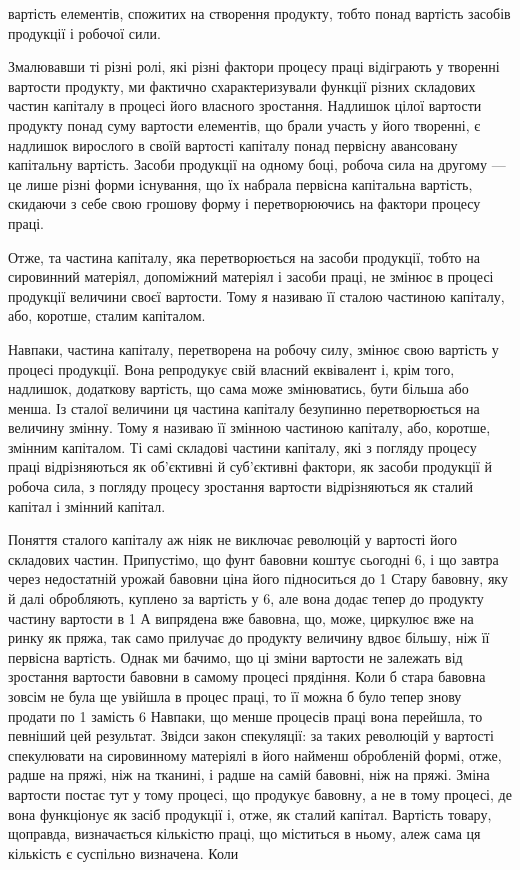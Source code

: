 \parcont{}  %
вартість елементів, спожитих на створення продукту, тобто понад вартість засобів продукції і робочої
сили.

Змалювавши ті різні ролі, які різні фактори процесу праці відіграють у творенні
вартости продукту, ми фактично схарактеризували функції різних складових частин
капіталу в процесі його власного зростання. Надлишок цілої вартости продукту
понад суму вартости елементів, що брали участь у його
творенні, є надлишок вирослого в своїй вартості капіталу понад первісну
авансовану капітальну вартість. Засоби продукції на одному боці, робоча сила
на другому — це лише різні форми існування, що їх набрала первісна капітальна
вартість, скидаючи з себе свою грошову форму і перетворюючись на
фактори процесу праці.

Отже, та частина капіталу, яка перетворюється на засоби продукції,
тобто на сировинний матеріял, допоміжний матеріял і засоби праці, не змінює в
процесі продукції величини своєї вартости. Тому я називаю її сталою частиною
капіталу, або, коротше, сталим капіталом.

Навпаки, частина капіталу, перетворена на робочу силу, змінює свою вартість у
процесі продукції. Вона репродукує свій власний еквівалент і, крім того,
надлишок, додаткову вартість, що сама може змінюватись, бути більша або менша.
Із сталої величини ця частина капіталу безупинно перетворюється
на величину змінну. Тому я називаю її змінною частиною капіталу, або, коротше,
змінним капіталом. Ті самі складові частини капіталу, які з погляду процесу
праці відрізняються як об’єктивні й суб’єктивні фактори, як засоби продукції й
робоча сила, з погляду процесу зростання вартости відрізняються як
сталий капітал і змінний капітал.

Поняття сталого капіталу аж ніяк не виключає революцій у вартості його складових
частин. Припустімо, що фунт бавовни коштує сьогодні 6, і що завтра через
недостатній урожай бавовни ціна його підноситься до 1 Стару бавовну,
яку й далі обробляють, куплено за вартість у 6, але вона додає тепер до
продукту частину вартости в 1 А випрядена вже бавовна, що, може,
циркулює вже на ринку як пряжа, так само прилучає до продукту величину вдвоє
більшу, ніж її первісна вартість. Однак ми бачимо, що ці зміни вартости не
залежать від зростання вартости бавовни в самому
процесі прядіння. Коли б стара бавовна зовсім не була ще увійшла в процес праці,
то її можна б було тепер знову продати по 1 замість 6 Навпаки,
що менше процесів праці вона перейшла, то певніший цей результат. Звідси закон
спекуляції: за таких революцій у вартості спекулювати на сировинному матеріялі
в його найменш обробленій формі, отже, радше на пряжі,
ніж на тканині, і радше на самій бавовні, ніж на пряжі. Зміна вартости постає
тут у тому процесі, що продукує бавовну, а не в тому процесі, де вона функціонує
як засіб продукції і, отже, як сталий капітал. Вартість товару, щоправда,
визначається кількістю праці, що міститься в ньому, алеж сама ця
кількість є суспільно визначена. Коли
\parbreak{}  %
